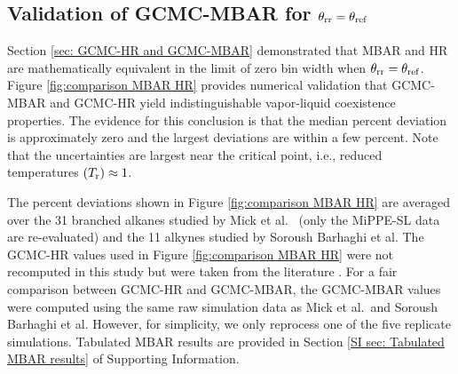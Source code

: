 \documentclass[journal=jced,manuscript=article]{achemso}
\begin{document}
\subsection{Validation of GCMC-MBAR for $\theta_{\rm rr} = \theta_{\rm ref}$} \label{sec: Constant theta} 

Section \ref{sec: GCMC-HR and GCMC-MBAR} demonstrated that MBAR and HR are mathematically equivalent in the limit of zero bin width when $\theta_{\rm rr} = \theta_{\rm ref}$. Figure \ref{fig:comparison MBAR HR} provides numerical validation that GCMC-MBAR and GCMC-HR yield indistinguishable vapor-liquid coexistence properties. The evidence for this conclusion is that the median percent deviation is approximately zero and the largest deviations are within a few percent. Note that the uncertainties are largest near the critical point, i.e., reduced temperatures $(T_{\rm r}) \approx 1$. 

The percent deviations shown in Figure \ref{fig:comparison MBAR HR} are averaged over the 31 branched alkanes studied by Mick et al.\cite{Potoff_branched}~ (only the MiPPE-SL data are re-evaluated) and the 11 alkynes studied by Soroush Barhaghi et al.\cite{Barhaghi2017} The GCMC-HR values used in Figure \ref{fig:comparison MBAR HR} were not recomputed in this study but were taken from the literature \cite{Potoff_branched,Barhaghi2017}. For a fair comparison between GCMC-HR and GCMC-MBAR, the GCMC-MBAR values were computed using the same raw simulation data as Mick et al.~and Soroush Barhaghi et al. However, for simplicity, we only reprocess one of the five replicate simulations. Tabulated MBAR results are provided in Section \ref{SI sec: Tabulated MBAR results} of Supporting Information.


\end{document}
